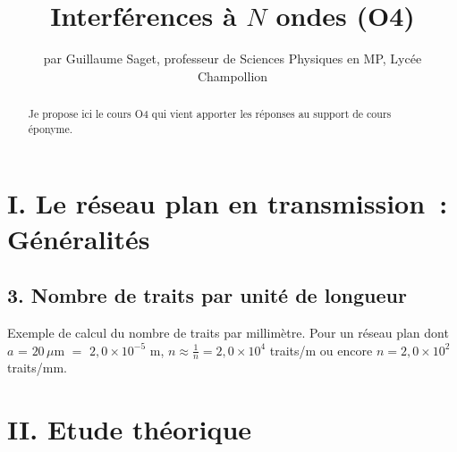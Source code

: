 \documentclass{article}
\title{\huge{\textbf{Interférences à $N$ ondes (O4)}}}
\author{par Guillaume Saget, professeur de Sciences Physiques en MP, Lycée Champollion}
\date{}
\begin{document}
\maketitle


\begin{abstract}
Je propose ici le cours O4 qui vient apporter les réponses au
support de cours éponyme.
\end{abstract}


\section*{I.  Le réseau plan en transmission : Généralités}
\subsection*{3.  Nombre de traits par unité de longueur}
Exemple de calcul du nombre de traits par millimètre. Pour
un réseau plan dont $a$ = $ 20 \,\mu$m $=$ $2,0\times 10^{-5}$ m, $n
\approx \frac{1}{n} = 2,0\times 10^{4}$ traits/m ou encore $n =
2,0\times 10^{2}$ traits/mm.

\section*{II. Etude théorique}
\end{document}
